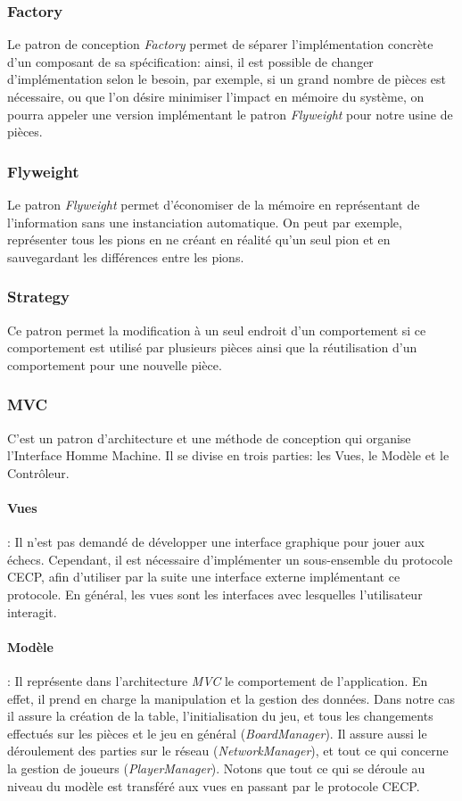 \documentclass[11pt]{article}
\begin{document}
\subsubsection{Factory}
\label{sec-3-3-2}
Le patron de conception \emph{Factory} permet de séparer l'implémentation concrète d'un composant de sa spécification: ainsi, il est possible de changer d'implémentation selon le besoin, par exemple, si un grand nombre de pièces est nécessaire, ou que l'on désire minimiser l'impact en mémoire du système, on pourra appeler une version implémentant le patron \emph{Flyweight} pour notre usine de pièces.
\subsubsection{Flyweight}
\label{sec-3-3-3}
Le patron \emph{Flyweight} permet d'économiser de la mémoire en représentant de l'information sans une instanciation automatique. On peut par exemple, représenter tous les pions en ne créant en réalité qu'un seul pion et en sauvegardant les différences entre les pions.
\subsubsection{Strategy}
\label{sec-3-3-4}
Ce patron permet la modification à un seul endroit d'un comportement si ce comportement est utilisé par plusieurs pièces ainsi que la réutilisation d'un comportement pour une nouvelle pièce.
\subsubsection{MVC}
\label{sec-3-3-5}
C'est un patron d'architecture et une méthode de conception qui organise l'Interface Homme Machine. Il se divise en trois parties: les Vues, le Modèle et le Contrôleur.
\paragraph{Vues} : Il n'est pas demandé de développer une interface graphique pour jouer aux échecs. Cependant, il est nécessaire d'implémenter un sous-ensemble du protocole CECP, afin d'utiliser par la suite une interface externe implémentant ce protocole.
En général, les vues sont les interfaces avec lesquelles l'utilisateur interagit.
\paragraph{Modèle} : Il représente dans l'architecture \emph{MVC} le comportement de l'application. En effet, il prend en charge la manipulation et la gestion des données. Dans notre cas il assure la création de la table, l'initialisation du jeu, et tous les changements effectués sur les pièces et le jeu en général (\emph{BoardManager}). Il assure aussi le déroulement des parties sur le réseau (\emph{NetworkManager}), et tout ce qui concerne la gestion de joueurs (\emph{PlayerManager}). Notons que tout ce qui se déroule au niveau du modèle est transféré aux vues en passant par le protocole CECP.
\end{document}
